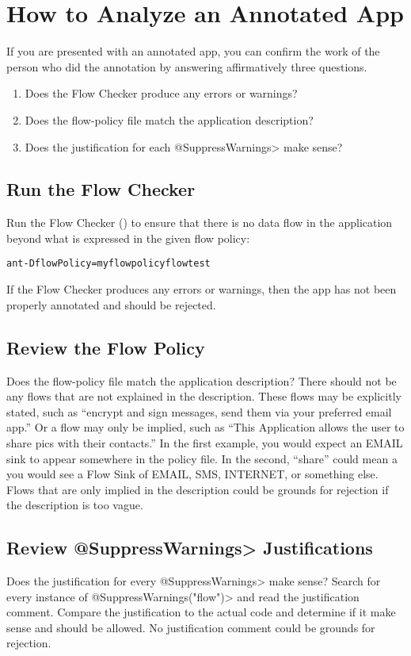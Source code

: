 \htmlhr
\chapter{How to Analyze an Annotated App\label{analyze-annotated-app}}

If you are presented with an annotated app, you can confirm the work of the
person who did the annotation by answering affirmatively three questions.

\begin{enumerate}
\item Does the Flow Checker produce any errors or warnings?
\item Does the flow-policy file match the application description?
\item Does the justification for each \<@SuppressWarnings> make sense?
\end{enumerate}

\section{Run the Flow Checker}

Run the Flow Checker () to ensure that there is no
data flow in the application beyond what is expressed in the given flow
policy:

\begin{alltt}
ant -DflowPolicy=myflowpolicy flowtest
\end{alltt}

If the Flow Checker produces any errors or warnings, then the app has not
been properly annotated and should be rejected.

\section{Review the Flow Policy}
Does the flow-policy file match the application description? There should
not be any flows that are not explained in the description.  These flows
may be explicitly stated, such as ``encrypt and sign messages, send them
via your preferred email app.''  Or a flow may only be implied, such as
``This Application allows the user to share pics with their contacts.''  In
the first example, you would expect an EMAIL sink to appear somewhere in
the policy file. In the second, ``share'' could mean a you would see a Flow
Sink of EMAIL, SMS, INTERNET, or something else.  Flows that are only
implied in the description could be grounds for rejection if the
description is too vague.

\section{Review \<@SuppressWarnings> Justifications}
Does the justification for every \<@SuppressWarnings> make sense? Search
for every instance of \<@SuppressWarnings("flow")> and read the
justification comment.  Compare the justification to the actual code and
determine if it make sense and should be allowed.  No justification comment
could be grounds for rejection.
  


